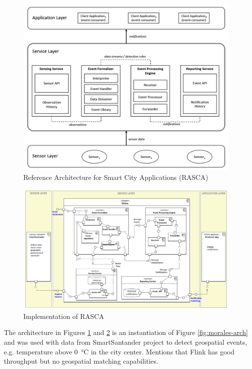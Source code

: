 \documentclass[]{scrartcl}
\begin{document}
\begin{figure}[h]
	\centering
	\includegraphics[width=\textwidth]{Garcia_2019a}
	\caption{Reference Architecture for Smart City Applications (RASCA)~\cite[p.~12]{GarciaAlvarez.2019}}
	\label{fig:rasca}
\end{figure}

\begin{figure}[h]
	\centering
	\includegraphics[width=\textwidth]{Garcia_2019b}
	\caption{Implementation of RASCA~\cite[p.~13]{GarciaAlvarez.2019}}
	\label{fig:rasca-impl}
\end{figure}

The architecture in Figures \ref{fig:rasca} and \ref{fig:rasca-impl} is an instantiation of Figure \ref{fig:morales-arch} and was used with data from SmartSantander project to detect geospatial events, e.g. temperature above \SI{0}{\celsius} in the city center. Mentions that Flink has good throughput but no geospatial matching capabilities. 
\end{document}
